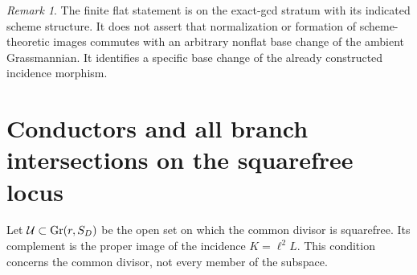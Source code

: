 \documentclass[11pt,reqno]{amsart}
\numberwithin{equation}{section}
\theoremstyle{definition}\newtheorem{definition}[theorem]{Definition}
\theoremstyle{remark}\newtheorem{remark}[theorem]{Remark}
\begin{document}
\begin{remark}
The finite flat statement is on the exact-gcd stratum with its indicated
scheme structure. It does not assert that normalization or formation of
scheme-theoretic images commutes with an arbitrary nonflat base change
of the ambient Grassmannian. It identifies a specific base change of
the already constructed incidence morphism.
\end{remark}

\section{Conductors and all branch intersections on the squarefree locus}
\label{sec:squarefree-v153}
Let $\mathcal U\subset\operatorname{Gr}(r,S_D)$ be the open set on which the common
divisor is squarefree. Its complement is the proper image of the
incidence $K=\ell^2L$. This condition concerns the common divisor,
not every member of the subspace.
\end{document}
